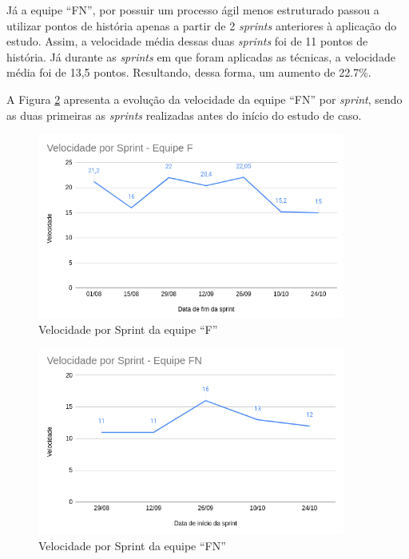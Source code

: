 \documentclass[
    12pt,       %
    openright,      %
    twoside,      %
    a4paper,      %
    english,      %
    french,       %
    spanish,      %
    brazil,       %
    ]{abntex2}
\begin{document}
Já a equipe ``FN'', por possuir um processo ágil menos estruturado passou a utilizar pontos de história apenas a partir de 2 \textit{sprints} anteriores à aplicação do estudo. Assim, a velocidade média dessas duas \textit{sprints} foi de 11 pontos de história. Já durante as \textit{sprints} em que foram aplicadas as técnicas, a velocidade média foi de 13,5 pontos. Resultando, dessa forma, um aumento de 22.7\%.

A Figura \ref{fig:vel_fruit} apresenta a evolução da velocidade da equipe ``FN'' por \textit{sprint}, sendo as duas primeiras as \textit{sprints} realizadas antes do início do estudo de caso.

\begin{figure}[H]
    \centering
    \includegraphics[width=0.9\textwidth]{src/tex/img/vel-founds.png}
    \caption{Velocidade por Sprint da equipe ``F''}
    \label{fig:vel_founds}
\end{figure}

\begin{figure}[H]
    \centering
    \includegraphics[width=0.9\textwidth]{src/tex/img/vel-fruit.png}
    \caption{Velocidade por Sprint da equipe ``FN''}
    \label{fig:vel_fruit}
\end{figure}
\end{document}
